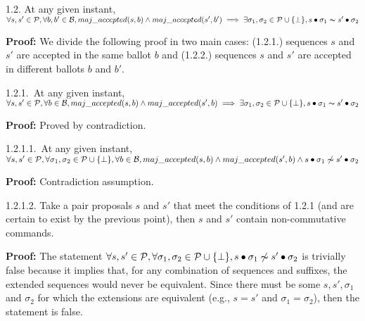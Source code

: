 \indent\indent\indent\parbox{\linewidth-\algorithmicindent*3}{\strut1.2. At any given instant, $\forall s,s' \in \mathcal{P},\forall b,b' \in \mathcal{B}, maj\_accepted(s,b) \land maj\_accepted(s',b') \implies \exists \sigma_1,\sigma_2 \in \mathcal{P} \cup \{\bot\}, s \bullet \sigma_1 \thicksim s' \bullet \sigma_2$}\par
\indent\indent\indent\indent\parbox{\linewidth-\algorithmicindent*4}{\strut\textbf{Proof:} We divide the following proof in two main cases: (1.2.1.) sequences $s$ and $s'$ are accepted in the same ballot $b$ and (1.2.2.) sequences $s$ and $s'$ are accepted in different ballots $b$ and $b'$.}\par
\indent\indent\indent\indent\indent\parbox{\linewidth-\algorithmicindent*5}{\strut1.2.1.~At any given instant, $\forall s,s' \in \mathcal{P},\forall b \in \mathcal{B}, maj\_accepted(s,b) \land maj\_accepted(s',b) \implies \exists \sigma_1,\sigma_2 \in \mathcal{P} \cup \{\bot\}, s \bullet \sigma_1 \thicksim s' \bullet \sigma_2$} \par
\indent\indent\indent\indent\indent\indent\parbox{\linewidth}{\strut\textbf{Proof:} Proved by contradiction.}\par
\indent\indent\indent\indent\indent\indent\indent\parbox{\linewidth-\algorithmicindent*7}{\strut1.2.1.1.~At any given instant, $\forall s,s' \in \mathcal{P}, \forall \sigma_1,\sigma_2 \in \mathcal{P} \cup \{\bot \},\forall b \in \mathcal{B}, maj\_accepted(s,b) \land maj\_accepted(s',b) \wedge s \bullet \sigma_1 \not\thicksim s' \bullet \sigma_2$} \par
\indent\indent\indent\indent\indent\indent\indent\indent\parbox{\linewidth}{\strut\textbf{Proof:} Contradiction assumption.}\par
\indent\indent\indent\indent\indent\indent\indent\parbox{\linewidth-\algorithmicindent*7}{\strut1.2.1.2. Take a pair proposals $s$ and $s'$ that meet the conditions of 1.2.1 (and are certain to exist by the previous point), then $s$ and $s'$ contain non-commutative commands.}\par
\indent\indent\indent\indent\indent\indent\indent\indent\parbox{\linewidth-\algorithmicindent*8}{\strut\textbf{Proof:} The statement $\forall s,s' \in \mathcal{P}, \forall \sigma_1,\sigma_2 \in \mathcal{P} \cup \{\bot \}, s \bullet \sigma_1 \not\thicksim s' \bullet \sigma_2$ is trivially false because it implies that, for any combination of sequences and suffixes, the extended sequences would never be equivalent. Since there must be some $s,s',\sigma_1$ and $\sigma_2$ for which the extensions are equivalent (e.g., $s=s'$ and $\sigma_1=\sigma_2$), then the statement is false.}\par
